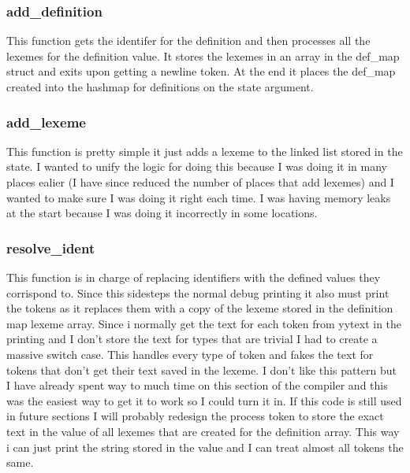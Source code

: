 \documentclass[11pt]{article}
\begin{document}
            \subsubsection{add\_definition}
                This function gets the identifer for the definition and then processes all the lexemes for the definition
                value. It stores the lexemes in an array in the def\_map struct and exits upon getting a newline token. At the end
                it places the def\_map created into the hashmap for definitions on the state argument.

            \subsubsection{add\_lexeme}
                This function is pretty simple it just adds a lexeme to the linked list stored in the state. I wanted to unify 
                the logic for doing this because I was doing it in many places ealier (I have since reduced the number of places that
                add lexemes) and I wanted to make sure I was doing it right each time. I was having memory leaks at the start because I
                was doing it incorrectly in some locations.

            \subsubsection{resolve\_ident}
                This function is in charge of replacing identifiers with the defined values they corrispond to. Since this sidesteps the
                normal debug printing it also must print the tokens as it replaces them with a copy of the 
                lexeme stored in the definition map lexeme array. Since i normally get the text for each
                token from yytext in the printing and I don't store the text for types that are trivial I had to create
                a massive switch case. This handles every type of token and fakes the text for tokens that don't get their text
                saved in the lexeme. I don't like this pattern but I have already spent way to much time on this section of the compiler
                and this was the easiest way to get it to work so I could turn it in. If this code is still used in future sections
                I will probably redesign the process token to store the exact text in the value of all lexemes that are created for
                the definition array. This way i can just print the string stored in the value and I can treat almost all tokens the same.
\end{document}
